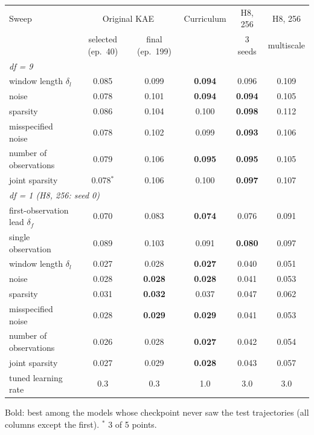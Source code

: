 \begin{center}\footnotesize
\begin{tabular}{lccccc}
\toprule
Sweep & \multicolumn{2}{c}{Original KAE} & Curriculum & H8, 256 & H8, 256\\
 & selected (ep.\ 40) & final (ep.\ 199) & & 3 seeds & multiscale\\
\midrule
\multicolumn{6}{l}{\emph{df = 9}}\\
window length $\delta_l$ & 0.085 & 0.099 & \textbf{0.094} & 0.096 & 0.109\\
noise                    & 0.078 & 0.101 & \textbf{0.094} & \textbf{0.094} & 0.105\\
sparsity                 & 0.086 & 0.104 & 0.100 & \textbf{0.098} & 0.112\\
misspecified noise       & 0.078 & 0.102 & 0.099 & \textbf{0.093} & 0.106\\
number of observations   & 0.079 & 0.106 & \textbf{0.095} & \textbf{0.095} & 0.105\\
joint sparsity           & 0.078$^\ast$ & 0.106 & 0.100 & \textbf{0.097} & 0.107\\
\midrule
\multicolumn{6}{l}{\emph{df = 1 (H8, 256: seed 0)}}\\
first-observation lead $\delta_f$ & 0.070 & 0.083 & \textbf{0.074} & 0.076 & 0.091\\
single observation       & 0.089 & 0.103 & 0.091 & \textbf{0.080} & 0.097\\
window length $\delta_l$ & 0.027 & 0.028 & \textbf{0.027} & 0.040 & 0.051\\
noise                    & 0.028 & \textbf{0.028} & \textbf{0.028} & 0.041 & 0.053\\
sparsity                 & 0.031 & \textbf{0.032} & 0.037 & 0.047 & 0.062\\
misspecified noise       & 0.028 & \textbf{0.029} & \textbf{0.029} & 0.041 & 0.053\\
number of observations   & 0.026 & 0.028 & \textbf{0.027} & 0.042 & 0.054\\
joint sparsity           & 0.027 & 0.029 & \textbf{0.028} & 0.043 & 0.057\\
\midrule
tuned learning rate      & 0.3 & 0.3 & 1.0 & 3.0 & 3.0\\
\bottomrule
\end{tabular}
\end{center}
{\footnotesize Bold: best among the models whose checkpoint never saw the test trajectories (all
columns except the first). $^\ast$ 3 of 5 points.}

